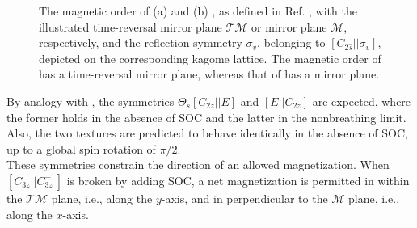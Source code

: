 \begin{figure}[tbhp]
\begin{subfigure}[c]{0.48\textwidth}
    \caption{}
    \label{fig: magnetic texture Mn3Sn}
    \end{subfigure}
    \caption{The magnetic order of (a)  and (b) , as defined in Ref. \cite{Quelle1}, with the illustrated time-reversal mirror plane $\mathcal{TM}$ or mirror plane $\mathcal{M}$, respectively, and the reflection symmetry $\sigma_v$, belonging to $[C_{2\hat{s}}||\sigma_v]$, depicted on the corresponding kagome lattice. The magnetic order of  has a time-reversal mirror plane, whereas that of  has a mirror plane.}
    \label{fig: magnetic texture Mn3Ge and Sn}
\end{figure}

By analogy with , the symmetries $\Theta_s [C_{2z}||E]$ and $[E||C_{2z}]$ are expected, where the former holds in the absence of SOC and the latter in the nonbreathing limit. 
Also, the two textures are predicted to behave identically in the absence of SOC, up to a global spin rotation of $\pi/2$.\\
These symmetries constrain the direction of an allowed magnetization. When $[C_{3z}||C_{3z}^{-1}]$ is broken by adding SOC, a net magnetization is permitted in  within the $\mathcal{TM}$ plane, i.e., along the $y$-axis, and in  perpendicular to the $\mathcal{M}$ plane, i.e., along the $x$-axis.  



